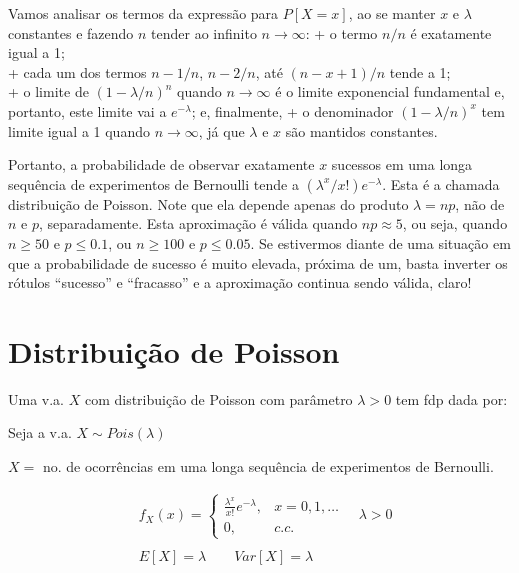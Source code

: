 \documentclass[
]{book}
\theoremstyle{definition}
\theoremstyle{definition}
\theoremstyle{definition}
\theoremstyle{remark}
\begin{document}
Vamos analisar os termos da expressão para \(P[X=x]\), ao se manter \(x\) e \(\lambda\) constantes e fazendo \(n\) tender ao infinito \(n\rightarrow \infty\):
+ o termo \(n/n\) é exatamente igual a 1;\\
+ cada um dos termos \(n-1/n\), \(n-2/n\), até \((n-x+1)/n\) tende a 1;\\
+ o limite de \((1 - \lambda/n)^n\) quando \(n \rightarrow \infty\) é o limite exponencial fundamental e, portanto, este limite vai a \(e^{-\lambda}\); e, finalmente,
+ o denominador \((1 - \lambda/n)^x\) tem limite igual a 1 quando \(n \rightarrow \infty\), já que \(\lambda\) e \(x\) são mantidos constantes.

Portanto, a probabilidade de observar exatamente \(x\) sucessos em uma longa sequência de experimentos de Bernoulli tende a \((\lambda^x/x!) e^{-\lambda}\). Esta é a chamada distribuição de Poisson. Note que ela depende apenas do produto \(\lambda = np\), não de \(n\) e \(p\), separadamente. Esta aproximação é válida quando \(np \approx 5\), ou seja, quando \(n\geq 50\) e \(p \leq 0.1\), ou \(n \geq 100\) e \(p \leq 0.05\). Se estivermos diante de uma situação em que a probabilidade de sucesso é muito elevada, próxima de um, basta inverter os rótulos ``sucesso'' e ``fracasso'' e a aproximação continua sendo válida, claro!

\hypertarget{distribuiuxe7uxe3o-de-poisson}{%
\section{Distribuição de Poisson}\label{distribuiuxe7uxe3o-de-poisson}}

Uma v.a. \(X\) com distribuição de Poisson com parâmetro \(\lambda > 0\) tem fdp dada por:

Seja a v.a. \(X \sim Pois(\lambda)\)

\(X =\) no. de ocorrências em uma longa sequência de experimentos de Bernoulli.

\begin{align*}
  &{} f_{X}(x) = \left\{
  \begin{array}{rl}
    \frac{\lambda^x}{x!} e^{-\lambda}, & x = 0, 1, \ldots\\
    0,           & c.c.
  \end{array}\right.
  \quad \lambda > 0
  \\ \\
  &{} E[X] = \lambda \qquad Var[X] = \lambda
\end{align*}
\end{document}
